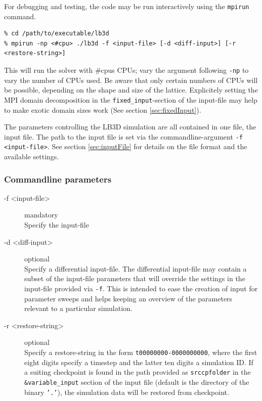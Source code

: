 \documentclass[a4paper]{article}
\begin{document}
For debugging and testing, the code may be run interactively using the
{\tt mpirun} command. 

\begin{verbatim}
% cd /path/to/executable/lb3d
% mpirun -np <#cpu> ./lb3d -f <input-file> [-d <diff-input>] [-r <restore-string>]
\end{verbatim}

This will run the solver with \#cpus CPUs; vary the argument following
{\tt -np} to vary the number of CPUs used. Be aware that only certain
numbers of CPUs will be possible, depending on the shape and size of the
lattice. Explicitely setting the MPI domain decomposition in the {\tt fixed\_input}-section of the input-file may help to make exotic domain sizes work (See section \ref{sec:fixedInput}).

The parameters controlling the LB3D simulation are all contained in one
file, the input file. The path to the input file is set via the commandline-argument {\tt -f {\textless}input-file{\textgreater}}. See section \ref{sec:inputFile} for details on the file format and the available settings.



\subsubsection{Commandline parameters}

\begin{description}
\item [-f {\textless}input-file{\textgreater}] mandatory~\\Specify the input-file
\item [-d {\textless}diff-input{\textgreater}] optional~\\Specify a differential input-file. The differential input-file may contain a subset of the input-file parameters that will override the settings in the input-file provided via {\tt -f}. This is intended to ease the creation of input for parameter sweeps and helps keeping an overview of the parameters relevant to a particular simulation.
\item [-r {\textless}restore-string{\textgreater}] optional~\\
Specify a restore-string in the form {\tt t00000000-0000000000}, where the first eight digits specify a timestep and the latter ten digits a simulation ID. If a suiting checkpoint is found in the path provided as {\tt srccpfolder} in the {\tt \&variable\_input} section of the input file (default is the directory of the binary {\tt '.'}), the simulation data will be restored from checkpoint. 

\end{description}
\end{document}
